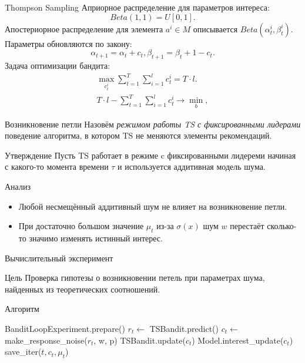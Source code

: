 \documentclass{beamer}
\begin{document}
\begin{frame}{Thompson Sampling}
Априорное распределение для параметров интереса: 
\[Beta(1, 1) = U[0, 1].\] 
Апостериорное распределение для элемента $a^i \in M$ описывается $Beta(\alpha_t^i, \beta_t^i)$. 
Параметры обновляются по закону:
\[\alpha_{t+1} = \alpha_t + c_t, \beta_{t+1} = \beta_t + 1 - c_t.\]
Задача оптимизации бандита:
\begin{gather*}  
\max_{c_t^i} \sum_{t = 1}^T \sum_{i = 1}^l c_t^i = T \cdot l.\\ 
   T \cdot l - \sum_{t = 1}^T \sum_{i = 1}^l c_t^i \to \min_{b}, 
\end{gather*}
\end{frame}
\begin{frame}{Возникновение петли}
Назовём \textit{режимом работы TS с фиксированными лидерами} поведение алгоритма, в котором TS не меняются элементы рекомендаций.
  \begin{block}{Утверждение}
  Пусть  TS работает в режиме c фиксированными лидереми начиная с какого-то момента времени $\tau$ и используется аддитивная модель шума. 
  \end{block}
  \begin{block}{Анализ}
  \begin{itemize}
      \item Любой несмещённый аддитивный шум не влияет на возникновение петли. 
      \item При достаточно большом значение $\mu_t$ из-за $\sigma (x)$ шум $w$ перестаёт сколько-то значимо изменять истинный интерес. 
  \end{itemize}
  \end{block}
\end{frame}
\begin{frame}{Вычислительный эксперимент}
\begin{block}{Цель}
Проверка гипотезы о возникновении петель при параметрах шума, найденных из теоретических соотношений. 
\end{block}

\begin{block}{Алгоритм}
\begin{algorithmic}
  \STATE BanditLoopExperiment.prepare()
    \STATE $r_t \leftarrow$ TSBandit.predict()
    \STATE $c_t \leftarrow$ make\_response\_noise($r_t$, w, p)
    \STATE TSBandit.update($c_t$)
    \STATE Model.interest\_update($c_t$)
    \STATE save\_iter($t, c_t, \mu_t$)
  \ENDFOR
\end{algorithmic}
\end{block}

\end{frame}
\end{document}
